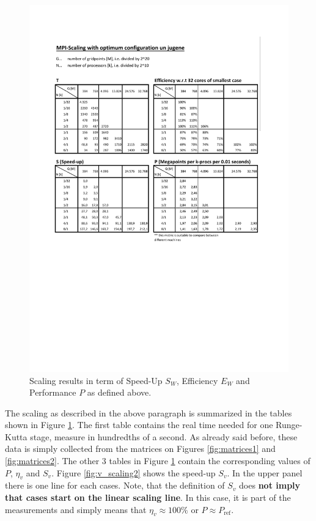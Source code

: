 \begin{figure}
\begin{centering}
\includegraphics[width=1.0\textwidth]{figs/scaling_overview.pdf}
\end{centering}
\caption{Scaling results in term of Speed-Up $S_W$, Efficiency $E_W$ and
Performance $P$ as defined above.}
\label{fig:v_scaling1}
\end{figure}

The scaling as described in the above paragraph is summarized in the tables
shown in Figure \ref{fig:v_scaling1}. The first table contains the real time
needed for one Runge-Kutta stage, measure in hundredths of a second. As already
said before, these data is simply collected from the matrices on
Figures \ref{fig:matrices1} and \ref{fig:matrices2}. The other 3 tables in
Figure \ref{fig:v_scaling1} contain the corresponding values of $P$, $\eta_v$
and $S_v$.  Figure \ref{fig:v_scaling2} shows the speed-up $S_v$. In the upper
panel there is one line for each cases.  Note, that the definition of $S_v$
does \textbf{not imply that cases start on the linear scaling line}. In this
case, it is part of the measurements and simply means that $\eta_v\approx 100\%$
or $P\approx P_\mathrm{ref}$.

